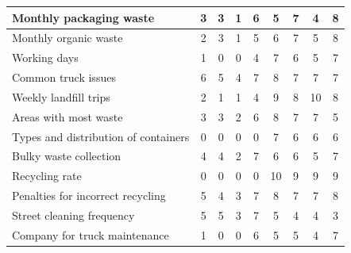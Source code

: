 \begin{longtable}{p{5cm}|cccc|cccc}
    \hline
    Monthly packaging waste              & 3            & 3             & 1             & 6            & 5            & 7             & 4             & 8            \\
    \hline
    Monthly organic waste                & 2            & 3             & 1             & 5            & 6            & 7             & 5             & 8            \\
    \hline
    Working days                         & 1            & 0             & 0             & 4            & 7            & 6             & 5             & 7            \\
    \hline
    Common truck issues                  & 6            & 5             & 4             & 7            & 8            & 7             & 7             & 7            \\
    \hline
    Weekly landfill trips                & 2            & 1             & 1             & 4            & 9            & 8             & 10            & 8            \\
    \hline
    Areas with most waste                & 3            & 3             & 2             & 6            & 8            & 7             & 7             & 5            \\
    \hline
    Types and distribution of containers & 0            & 0             & 0             & 0            & 7            & 6             & 6             & 6            \\
    \hline
    Bulky waste collection               & 4            & 4             & 2             & 7            & 6            & 6             & 5             & 7            \\
    \hline
    Recycling rate                       & 0            & 0             & 0             & 0            & 10           & 9             & 9             & 9            \\
    \hline
    Penalties for incorrect recycling    & 5            & 4             & 3             & 7            & 8            & 7             & 7             & 8            \\
    \hline
    Street cleaning frequency            & 5            & 5             & 3             & 7            & 5            & 4             & 4             & 3            \\
    \hline
    Company for truck maintenance        & 1            & 0             & 0             & 6            & 5            & 5             & 4             & 7            \\

\end{longtable}
